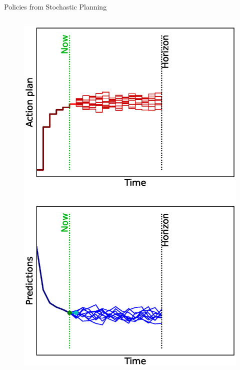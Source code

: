 \documentclass[lecture]{beamer}
\begin{document}
\begin{frame}{\normalsize Policies from Stochastic Planning}
\begin{columns}
\begin{overlayarea}{\textwidth}{0.9\textheight}
\begin{figure}
{          \includegraphics[width=\FS\textwidth,clip]{Codes/MPC/MPCMCWRONG5.eps}
        }%
        {%
}
\end{figure}
\end{overlayarea}
\end{columns}
\end{frame}
\end{document}
